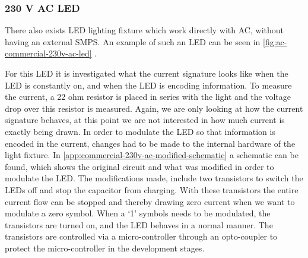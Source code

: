 
\subsubsection{230 V AC LED}
\label{subsubsec:ac-230v-led}



There also exists LED lighting fixture which work directly with AC, without having an external SMPS.
An example of such an LED can be seen in \autoref{fig:ac-commercial-230v-ac-led} \cite{commercial-230v-ac-led-aliexpress}.



For this LED it is investigated what the current signature looks like when the LED is constantly on, and when the LED is encoding information.
To measure the current, a 22 ohm resistor is placed in series with the light and the voltage drop over this resistor is measured.
Again, we are only looking at how the current signature behaves, at this point we are not interested in how much current is exactly being drawn.
In order to modulate the LED so that information is encoded in the current, changes had to be made to the internal hardware of the light fixture.
In \autoref{app:commercial-230v-ac-modified-schematic} a schematic can be found, which shows the original circuit and what was modified in order to modulate the LED.
The modifications made, include two transistors to switch the LEDs off and stop the capacitor from charging. 
With these transistors the entire current flow can be stopped and thereby drawing zero current when we want to modulate a zero symbol.
When a `1' symbols needs to be modulated, the transistors are turned on, and the LED behaves in a normal manner.
The transistors are controlled via a micro-controller through an opto-coupler to protect the micro-controller in the development stages.



